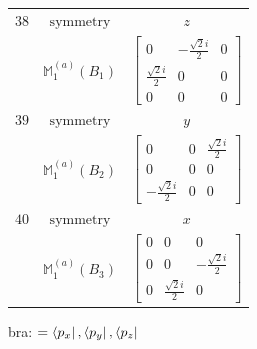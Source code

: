 \documentclass[fleqn,8pt,landscape]{jsarticle}
\begin{document}
\begin{longtable}{ccc}
$ 38 $ & $ \text{symmetry} $ & $ z $ \\
$  $ & $ \mathbb{M}_{1}^{(a)}(B_{1}) $ & $ \begin{bmatrix} 0 & - \frac{\sqrt{2} i}{2} & 0 \\ \frac{\sqrt{2} i}{2} & 0 & 0 \\ 0 & 0 & 0 \end{bmatrix} $ \\ \hline
$ 39 $ & $ \text{symmetry} $ & $ y $ \\
$  $ & $ \mathbb{M}_{1}^{(a)}(B_{2}) $ & $ \begin{bmatrix} 0 & 0 & \frac{\sqrt{2} i}{2} \\ 0 & 0 & 0 \\ - \frac{\sqrt{2} i}{2} & 0 & 0 \end{bmatrix} $ \\ \hline
$ 40 $ & $ \text{symmetry} $ & $ x $ \\
$  $ & $ \mathbb{M}_{1}^{(a)}(B_{3}) $ & $ \begin{bmatrix} 0 & 0 & 0 \\ 0 & 0 & - \frac{\sqrt{2} i}{2} \\ 0 & \frac{\sqrt{2} i}{2} & 0 \end{bmatrix} $ \\ \hline
\end{longtable}
bra: $=\bra{p_{x}}, \bra{p_{y}}, \bra{p_{z}}$
\end{document}
